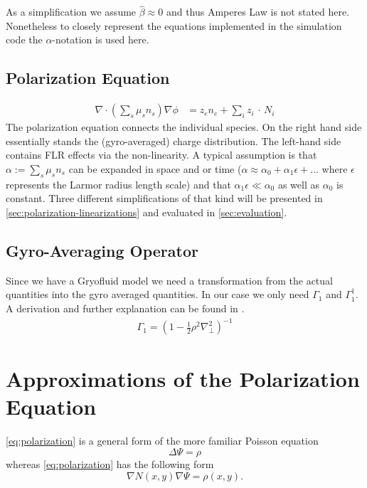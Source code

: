\documentclass[master.tex]{subfiles}
\begin{document}
As a simplification we assume $\hat{\beta} \approx 0$ and thus Amperes Law is not stated here. Nonetheless to closely represent the equations implemented in the simulation code the $\alpha$-notation is used here.

\subsection{Polarization Equation}

\begin{align}
    \nabla \cdot \left( \sum_s \mu_s n_s \right) \nabla \phi &= z_e n_e + \sum_i z_i \, \cdot \, N_i \label{eq:polarization}
\end{align}
The polarization equation connects the individual species. On the right hand side essentially stands the (gyro-averaged) charge distribution. The left-hand side contains \ac{FLR} effects via the non-linearity. A typical assumption is that $\alpha := \sum_s \mu_s n_s$ can be expanded in space and or time ($\alpha \approx \alpha_0 + \alpha_1 \epsilon + ...$ where $\epsilon$ represents the Larmor radius length scale) and that $\alpha_1 \epsilon \ll \alpha_0$ as well as $\alpha_0$ is constant. Three different simplifications of that kind will be presented in \autoref{sec:polarization-linearizations} and evaluated in \autoref{sec:evaluation}. 


\subsection{Gyro-Averaging Operator}
Since we have a Gryofluid model we need a transformation from the actual quantities into the gyro averaged quantities. In our case we only need $\Gamma_1$ and $\Gamma_1^\dagger$. A derivation and further explanation can be found in \cite{HeldDisseration}.
\begin{align}
    \Gamma_1 = \left(1- \frac{1}{2} \rho^2 \nabla_\perp^2\right)^{-1}
\end{align}


\section{Approximations of the Polarization Equation} \label{sec:polarization-linearizations}
\autoref{eq:polarization} is a general form of the more familiar Poisson equation
\begin{equation}\label{eq:linear-poisson-equation}
    \Delta \Psi = \rho 
\end{equation}
whereas \autoref{eq:polarization} has the following form
\begin{equation}\label{eq:general-poisson}
    \nabla N(x,y) \nabla \Psi = \rho(x,y).
\end{equation}
\end{document}
